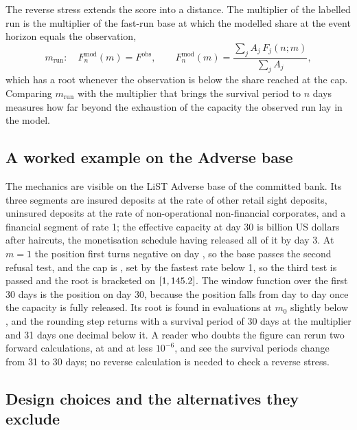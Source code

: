 The reverse stress extends the score into a distance. The multiplier of the labelled run is the multiplier of the fast-run base at which the modelled share at the event horizon equals the observation,
\begin{equation}
m_{\mathrm{run}}:\quad F^{\mathrm{mod}}_{n}(m)=F^{\mathrm{obs}},\qquad F^{\mathrm{mod}}_{n}(m)=\frac{\sum_j A_j\,F_j(n;m)}{\sum_j A_j},
\label{eq:labelled}
\end{equation}
which has a root whenever the observation is below the share reached at the cap. Comparing $m_{\mathrm{run}}$ with the multiplier that brings the survival period to $n$ days measures how far beyond the exhaustion of the capacity the observed run lay in the model.

\subsection{A worked example on the Adverse base}

The mechanics are visible on the LiST Adverse base of the committed bank. Its three segments are insured deposits at the rate of other retail sight deposits, uninsured deposits at the rate of non-operational non-financial corporates, and a financial segment of rate 1; the effective capacity at day 30 is \capTzero{} billion US dollars after haircuts, the monetisation schedule having released all of it by day 3. At $m=1$ the position first turns negative on day \spAdv{}, so the base passes the second refusal test, and the cap is \capAdv{}, set by the fastest rate below 1, so the third test is passed and the root is bracketed on $[1,145.2{}]$. The window function over the first 30 days is the position on day 30, because the position falls from day to day once the capacity is fully released. Its root is found in \evalsSolve{} evaluations at $m_0$ slightly below \mAdv{}, and the rounding step returns \mAdv{} with a survival period of 30 days at the multiplier and 31 days one decimal below it. A reader who doubts the figure can rerun two forward calculations, at \mAdv{} and at \mAdv{} less $10^{-6}$, and see the survival periods change from 31 to 30 days; no reverse calculation is needed to check a reverse stress.

\subsection{Design choices and the alternatives they exclude}

